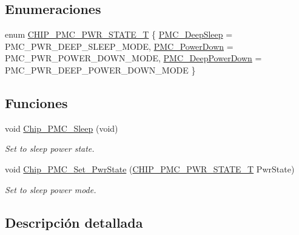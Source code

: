 \subsection*{Enumeraciones}
\begin{DoxyCompactItemize}
\item 
enum \hyperlink{group___p_m_c__18_x_x__43_x_x_ga69f642b5034785c56bb9c45e4dd780de}{C\+H\+I\+P\+\_\+\+P\+M\+C\+\_\+\+P\+W\+R\+\_\+\+S\+T\+A\+T\+E\+\_\+T} \{ \hyperlink{group___p_m_c__18_x_x__43_x_x_gga69f642b5034785c56bb9c45e4dd780dea31d40a23015643fcc99a943b65841164}{P\+M\+C\+\_\+\+Deep\+Sleep} = P\+M\+C\+\_\+\+P\+W\+R\+\_\+\+D\+E\+E\+P\+\_\+\+S\+L\+E\+E\+P\+\_\+\+M\+O\+DE, 
\hyperlink{group___p_m_c__18_x_x__43_x_x_gga69f642b5034785c56bb9c45e4dd780dea9ab5cbaebd32ff7ae5414220e7281b04}{P\+M\+C\+\_\+\+Power\+Down} = P\+M\+C\+\_\+\+P\+W\+R\+\_\+\+P\+O\+W\+E\+R\+\_\+\+D\+O\+W\+N\+\_\+\+M\+O\+DE, 
\hyperlink{group___p_m_c__18_x_x__43_x_x_gga69f642b5034785c56bb9c45e4dd780dea9076408a570dc195ff5615835a93d678}{P\+M\+C\+\_\+\+Deep\+Power\+Down} = P\+M\+C\+\_\+\+P\+W\+R\+\_\+\+D\+E\+E\+P\+\_\+\+P\+O\+W\+E\+R\+\_\+\+D\+O\+W\+N\+\_\+\+M\+O\+DE
 \}
\end{DoxyCompactItemize}
\subsection*{Funciones}
\begin{DoxyCompactItemize}
\item 
void \hyperlink{group___p_m_c__18_x_x__43_x_x_ga38f5a78a75086be129f7be269d8320d4}{Chip\+\_\+\+P\+M\+C\+\_\+\+Sleep} (void)
\begin{DoxyCompactList}\small\item\em Set to sleep power state. \end{DoxyCompactList}\item 
void \hyperlink{group___p_m_c__18_x_x__43_x_x_ga8b70604e37d7db74a727abe576933208}{Chip\+\_\+\+P\+M\+C\+\_\+\+Set\+\_\+\+Pwr\+State} (\hyperlink{group___p_m_c__18_x_x__43_x_x_ga69f642b5034785c56bb9c45e4dd780de}{C\+H\+I\+P\+\_\+\+P\+M\+C\+\_\+\+P\+W\+R\+\_\+\+S\+T\+A\+T\+E\+\_\+T} Pwr\+State)
\begin{DoxyCompactList}\small\item\em Set to sleep power mode. \end{DoxyCompactList}\end{DoxyCompactItemize}


\subsection{Descripción detallada}


